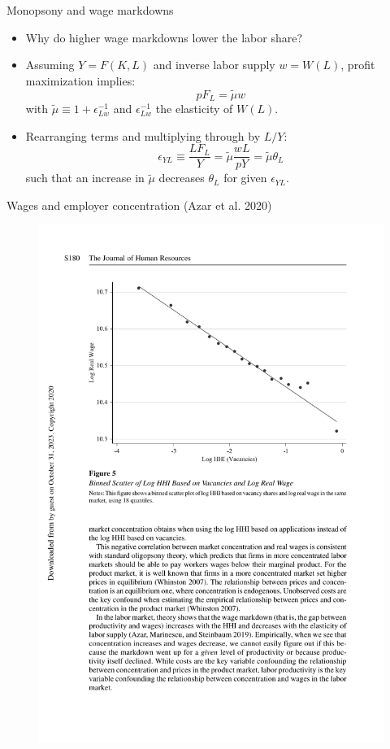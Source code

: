\documentclass[notes=show]{beamer}
\begin{document}
\begin{frame}{Monopsony and wage markdowns}
\begin{itemize}
\item Why do higher wage markdowns lower the labor share? \medskip
\item Assuming $ Y= F(K,L)$ and inverse labor supply $w=W(L)$, profit maximization implies:
\begin{equation*}
    p F_{L} = \tilde{\mu} w
\end{equation*}
with $ \tilde{\mu} \equiv 1+ \epsilon_{Lw}^{-1} $ and $ \epsilon_{Lw}^{-1}$ the elasticity of $W(L)$.
\item Rearranging terms and multiplying through by $L/Y$:
\begin{equation*}
    \epsilon_{YL} \equiv \frac{LF_{L}}{Y} = \tilde{\mu} \frac{wL}{p Y}  = \tilde{\mu} \theta_{L}
\end{equation*}
such that an increase in $\tilde{\mu}$ decreases $\theta_{L}$ for given $\epsilon_{YL}$.
\end{itemize}
\end{frame}

\begin{frame}{ Wages and employer concentration (Azar et al. 2020)}
\begin{figure}[p!]
 \includegraphics[width=.9\textwidth]{figure-AMS-5.pdf} 
\end{figure}
\end{frame}
\end{document}
